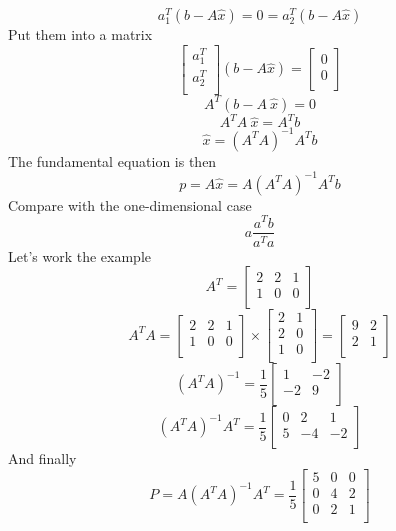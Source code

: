 \documentclass[11pt, oneside]{article}
\begin{document}
\[ a_1^T(b-A \hat{x}) = 0 =  a_2^T(b-A \hat{x}) \]
Put them into a matrix
\[  
\begin{bmatrix} 
  a_1^T    \\ 
  a_2^T    \\
\end{bmatrix}
(b-A\hat{x}) =
\begin{bmatrix} 
  0    \\ 
  0    \\
\end{bmatrix}
\]
\[A^T(b-A\ \hat{x}) = 0 \]
\[A^T A\ \hat{x} = A^Tb \]
\[ \hat{x} = (A^T A)^{-1}A^Tb \]
The fundamental equation is then
\[ p = A \hat{x} = A(A^T A)^{-1}A^Tb \]
Compare with the one-dimensional case
\[ a\frac{a^Tb}{a^Ta} \]
Let's work the example
\[ A^T = 
\begin{bmatrix} 
  2  &  2  &  1   \\ 
  1  &  0  &  0   \\
\end{bmatrix}
\]
\[A^T A = 
\begin{bmatrix} 
  2  &  2  &  1   \\ 
  1  &  0  &  0   \\
\end{bmatrix}
\times
\begin{bmatrix} 
  2  &  1   \\ 
  2  &  0   \\
  1  &  0   \\
\end{bmatrix}
=
\begin{bmatrix} 
  9  &  2   \\ 
  2  &  1   \\
\end{bmatrix}
\]
\[ (A^T A)^{-1} = \frac{1}{5}
\begin{bmatrix} 
1  &  -2   \\ 
  -2  & 9   \\
\end{bmatrix}
\]
\[(A^T A)^{-1}A^T = \frac{1}{5} 
\begin{bmatrix} 
  0  &  2  &  1   \\ 
  5  &  -4  &  -2   \\
\end{bmatrix}
\]
And finally
\[P = A (A^T A)^{-1}A^T = \frac{1}{5} 
\begin{bmatrix} 
  5  &  0  &  0   \\ 
  0  &  4  &  2   \\
  0  &  2  &  1   \\
\end{bmatrix}
\]
\end{document}
